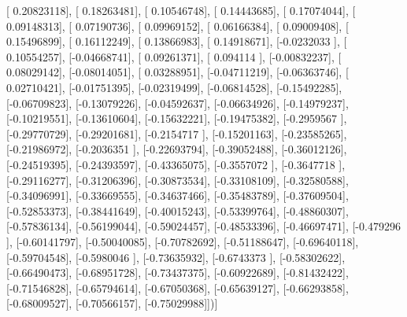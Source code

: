 \documentclass{article}
\begin{document}
       [ 0.20823118],
       [ 0.18263481],
       [ 0.10546748],
       [ 0.14443685],
       [ 0.17074044],
       [ 0.09148313],
       [ 0.07190736],
       [ 0.09969152],
       [ 0.06166384],
       [ 0.09009408],
       [ 0.15496899],
       [ 0.16112249],
       [ 0.13866983],
       [ 0.14918671],
       [-0.0232033 ],
       [ 0.10554257],
       [-0.04668741],
       [ 0.09261371],
       [ 0.094114  ],
       [-0.00832237],
       [ 0.08029142],
       [-0.08014051],
       [ 0.03288951],
       [-0.04711219],
       [-0.06363746],
       [ 0.02710421],
       [-0.01751395],
       [-0.02319499],
       [-0.06814528],
       [-0.15492285],
       [-0.06709823],
       [-0.13079226],
       [-0.04592637],
       [-0.06634926],
       [-0.14979237],
       [-0.10219551],
       [-0.13610604],
       [-0.15632221],
       [-0.19475382],
       [-0.2959567 ],
       [-0.29770729],
       [-0.29201681],
       [-0.2154717 ],
       [-0.15201163],
       [-0.23585265],
       [-0.21986972],
       [-0.2036351 ],
       [-0.22693794],
       [-0.39052488],
       [-0.36012126],
       [-0.24519395],
       [-0.24393597],
       [-0.43365075],
       [-0.3557072 ],
       [-0.3647718 ],
       [-0.29116277],
       [-0.31206396],
       [-0.30873534],
       [-0.33108109],
       [-0.32580588],
       [-0.34096991],
       [-0.33669555],
       [-0.34637466],
       [-0.35483789],
       [-0.37609504],
       [-0.52853373],
       [-0.38441649],
       [-0.40015243],
       [-0.53399764],
       [-0.48860307],
       [-0.57836134],
       [-0.56199044],
       [-0.59024457],
       [-0.48533396],
       [-0.46697471],
       [-0.479296  ],
       [-0.60141797],
       [-0.50040085],
       [-0.70782692],
       [-0.51188647],
       [-0.69640118],
       [-0.59704548],
       [-0.5980046 ],
       [-0.73635932],
       [-0.6743373 ],
       [-0.58302622],
       [-0.66490473],
       [-0.68951728],
       [-0.73437375],
       [-0.60922689],
       [-0.81432422],
       [-0.71546828],
       [-0.65794614],
       [-0.67050368],
       [-0.65639127],
       [-0.66293858],
       [-0.68009527],
       [-0.70566157],
       [-0.75029988]])]
\end{document}
